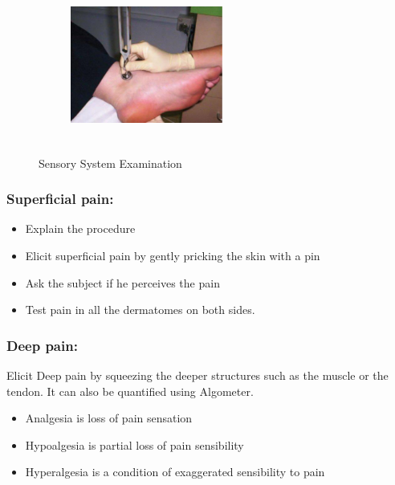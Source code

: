 \documentclass[a4paper,12pt]{book}
\begin{document}
{\begin{figure}[H]
\begin{subfigure}[t]{.43\textwidth}
			\label{twoPointDiscrimination}
		\end{subfigure}
		\hspace{\fill}
		\begin{subfigure}[t]{.43\textwidth}
			\centering
			\includegraphics[width=5cm,height=5cm]{./clinicalPhysioPic/sensorySystem2.jpg}
			\label{vibrationSense}
		\end{subfigure}
		\caption*{Sensory System Examination}
		
	\end{figure}
	}
\subsubsection*{Superficial pain:}
\begin{itemize}
\item{Explain the procedure}
\item{Elicit superficial pain by gently pricking the skin with a pin}
\item{Ask the subject if he perceives the pain}
\item{Test pain in all the dermatomes on both sides.}
\end{itemize}
\subsubsection*{Deep pain:}
	Elicit Deep pain by squeezing the deeper structures such as the muscle or the tendon. It can also be quantified using Algometer.
	\begin{itemize}
\item{Analgesia is loss of pain sensation}
\item{Hypoalgesia is partial loss of pain sensibility}
\item{Hyperalgesia is a condition of exaggerated sensibility to pain}
	\end{itemize}
\end{document}
